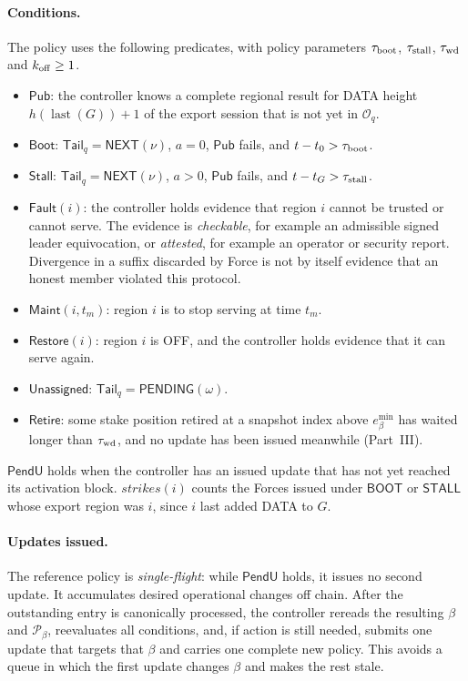 \documentclass[11pt,a4paper]{article}
\newcommand{\tagg}[1]{\ensuremath{\mathsf{#1}}}
\newcommand{\defterm}[1]{\textcolor{rrBlue}{\textit{#1}}}
\newcounter{protocol}
\begin{document}
\paragraph{Conditions.}
The policy uses the following predicates, with policy parameters
$\tau_{\rm boot}$, $\tau_{\rm stall}$, $\tau_{\rm wd}$ and $k_{\rm off}\ge1$.
\begin{itemize}
\item $\tagg{Pub}$: the controller knows a complete regional result for
DATA height $h(\operatorname{last}(G))+1$ of the export session that is
not yet in $\mathcal O_q$.
\item $\tagg{Boot}$: $\mathsf{Tail}_q=\tagg{NEXT}(\nu)$, $a=0$, $\tagg{Pub}$ fails,
and $t-t_0>\tau_{\rm boot}$.
\item $\tagg{Stall}$: $\mathsf{Tail}_q=\tagg{NEXT}(\nu)$, $a>0$, $\tagg{Pub}$ fails,
and $t-t_G>\tau_{\rm stall}$.
\item $\tagg{Fault}(i)$: the controller holds evidence that region $i$
cannot be trusted or cannot serve. The evidence is \emph{checkable}, for
example an admissible signed leader equivocation, or
\emph{attested}, for example an operator or security report. Divergence
in a suffix discarded by Force is not by itself evidence that an honest
member violated this protocol.
\item $\tagg{Maint}(i,t_m)$: region $i$ is to stop serving at time $t_m$.
\item $\tagg{Restore}(i)$: region $i$ is OFF, and the controller holds
evidence that it can serve again.
\item $\tagg{Unassigned}$: $\mathsf{Tail}_q=\tagg{PENDING}(\omega)$.
\item $\tagg{Retire}$: some stake position retired at a snapshot index
above $e^{\min}_\beta$ has waited longer than $\tau_{\rm wd}$, and no update
has been issued meanwhile (Part~III).
\end{itemize}
$\tagg{PendU}$ holds when the controller has an issued update that has
not yet reached its activation block. $\mathit{strikes}(i)$ counts the
Forces issued under \tagg{BOOT} or \tagg{STALL} whose export region was
$i$, since $i$ last added DATA to $G$.

\paragraph{Updates issued.}
The reference policy is \defterm{single-flight}: while $\tagg{PendU}$
holds, it issues no second update. It accumulates desired operational
changes off chain. After the outstanding entry is canonically processed,
the controller rereads the resulting $\beta$ and $\mathcal P_\beta$, reevaluates
all conditions, and, if action is still needed, submits one update that
targets that $\beta$ and carries one complete new policy. This avoids a
queue in which the first update changes $\beta$ and makes the rest stale.
\end{document}

